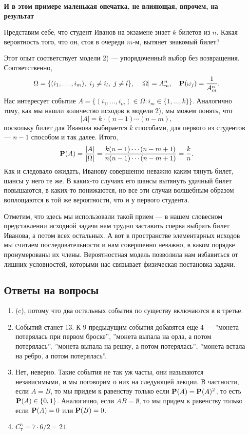 \documentclass[11 pt,russian]{article}
\begin{document}
\begin{Exam}
{\bf И в этом примере маленькая опечатка, не влияющая, впрочем, на результат}

Представим себе, что студент Иванов на экзамене знает $k$ билетов из $n$. Какая вероятность того, что он, стоя в очереди $m$-м, вытянет знакомый билет?

Этот опыт соответствует модели 2) --- упорядоченный выбор без возвращения. Соответственно, 
$$\Omega = \{(i_1,\dotsc,i_m),\ i_j\neq i_l,\ j\neq l\},\quad |\Omega|=A_m^n,\quad {\bf P}(\omega_j) = \frac{1}{A_m^n}.
$$
 Нас интересует событие $A=\{(i_1,\dotsc,i_m)\in \Omega: i_m \in \{1,\dotsc,k\}\}$. Аналогично тому, как мы нашли количество исходов в модели 2), мы можем понять, что 
 $$
 |A| = k\cdot (n-1) \dotsm (n-m), 
 $$
 поскольку билет для Иванова выбирается $k$ способами, для первого из студентов --- $n-1$ способом и так далее. Итого,
 $$
 {\bf P}(A) = \frac{|A|}{|\Omega|} = \frac{k(n-1)\dotsm(n-m+1)}{n(n-1)\dotsm(n-m+1)} = \frac kn.
 $$
 Как и следовало ожидать, Иванову совершенно неважно каким тянуть билет, шансы у него те же. В каких-то случаях его шансы вытянуть удачный билет повышаются, в каких-то понижаются, но все эти случаи волшебным образом воплощаются в той же вероятности, что и у первого студента.
 
Отметим, что здесь мы использовали такой прием --- в нашем словесном представлении исходной задачи нам трудно заставить сперва выбрать билет Иванова, а потом всех остальных. А вот в пространстве элементарных исходов мы считаем последовательности и нам совершенно неважно, в каком порядке пронумерованы их члены. Вероятностная модель позволила нам избавиться от лишних условностей, которыми нас связывает физическая постановка задачи.
\end{Exam}
\subsection{Ответы на вопросы}
\begin{enumerate}
\item (c), потому что два остальных события по существу включаются в в третье.
\item Событий станет 13. К 9 предыдущим события добавятся еще 4 --- ''монета потерялась при первом броске'', ''монета выпала на орла, а потом потерялась'', ''монета выпала на решку, а потом потерялась'', ''монета встала на ребро, а потом потерялась''.
\item Нет, неверно. Такие события не так уж часты, они называются независимыми, и мы поговорим о них на следующей лекции. В частности, если $A=B$, то мы придем к равенству только если ${\bf P}(A) = {\bf P}(A)^2$, то есть ${\bf P}(A)\in \{0,1\}$. Аналогично, если $AB=\emptyset$, то мы придем к равенству только если ${\bf P}(A)=0$ или ${\bf P}(B)=0$.
\item $C_7^5 = 7\cdot 6/2 = 21$.
\end{enumerate}
\end{document}

